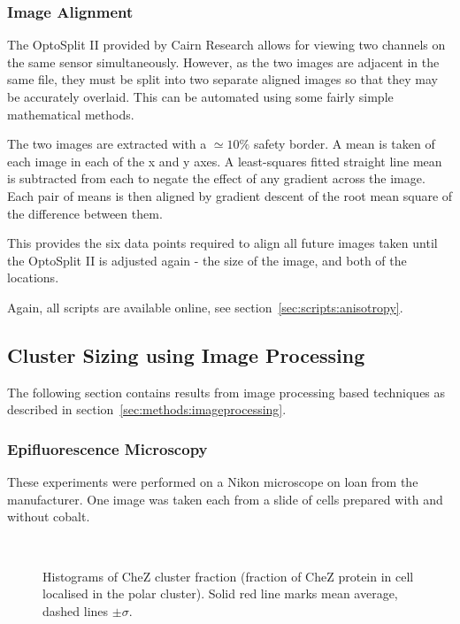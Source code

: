 \documentclass[../main.tex]{subfiles}
\begin{document}
\subsubsection{Image Alignment}

The OptoSplit II provided by Cairn Research allows for viewing two channels on the same sensor simultaneously. However, as the two images are adjacent in the same file, they must be split into two separate aligned images so that they may be accurately overlaid. This can be automated using some fairly simple mathematical methods.

The two images are extracted with a \(\simeq10\%\) safety border. A mean is taken of each image in each of the x and y axes. A least-squares fitted straight line mean is subtracted from each to negate the effect of any gradient across the image. Each pair of means is then aligned by gradient descent of the root mean square of the difference between them.

This provides the six data points required to align all future images taken until the OptoSplit II is adjusted again - the size of the image, and both of the locations.

Again, all scripts are available online, see section~\ref{sec:scripts:anisotropy}.

\newpage
\subsection{Cluster Sizing using Image Processing}

The following section contains results from image processing based techniques as described in section~\ref{sec:methods:imageprocessing}.

\subsubsection{Epifluorescence Microscopy}
\label{sec:results:cs:epi}

These experiments were performed on a Nikon microscope on loan from the manufacturer. One image was taken each from a slide of cells prepared with and without cobalt.

\begin{figure}[h!]
\begin{center}
\\
\caption[Image processing results on Nikon microscope]{Histograms of CheZ cluster fraction (fraction of CheZ protein in cell localised in the polar cluster). Solid red line marks mean average, dashed lines \(\pm\sigma\).}
\label{fig:results:nikon}
\end{center}
\end{figure}
\end{document}

